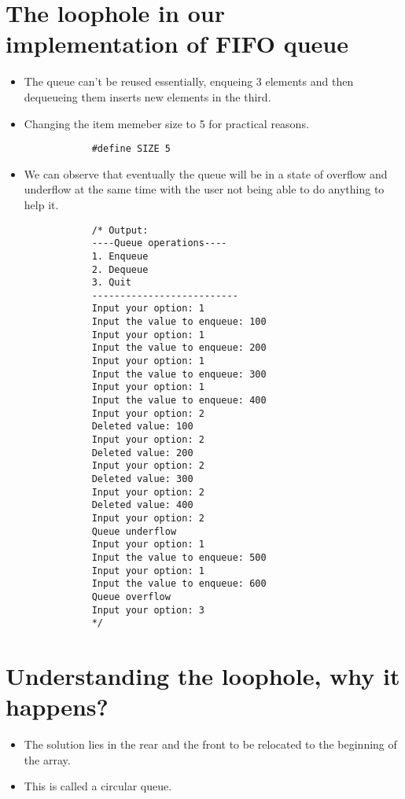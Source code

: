 \section{The loophole in our implementation of FIFO queue}
\begin{itemize}
    \item The queue can't be reused essentially, enqueing 3 elements and then dequeueing them inserts new elements in the third. 
    \item Changing the item memeber size to 5 for practical reasons. 
        \begin{verbatim}
            #define SIZE 5
        \end{verbatim}
    
    \item We can observe that eventually the queue will be in a state of overflow and underflow at the same time with the user not being able to do anything to help it. 
        \begin{verbatim}
            /* Output: 
            ----Queue operations----
            1. Enqueue
            2. Dequeue
            3. Quit
            --------------------------
            Input your option: 1
            Input the value to enqueue: 100
            Input your option: 1
            Input the value to enqueue: 200
            Input your option: 1
            Input the value to enqueue: 300
            Input your option: 1
            Input the value to enqueue: 400
            Input your option: 2
            Deleted value: 100
            Input your option: 2
            Deleted value: 200
            Input your option: 2
            Deleted value: 300
            Input your option: 2
            Deleted value: 400
            Input your option: 2
            Queue underflow
            Input your option: 1
            Input the value to enqueue: 500
            Input your option: 1
            Input the value to enqueue: 600
            Queue overflow
            Input your option: 3
            */
        \end{verbatim}
\end{itemize}


\section{Understanding the loophole, why it happens?}
\begin{itemize}
    \item The solution lies in the rear and the front to be relocated to the beginning of the array. 
    \item This is called a circular queue.
\end{itemize}


